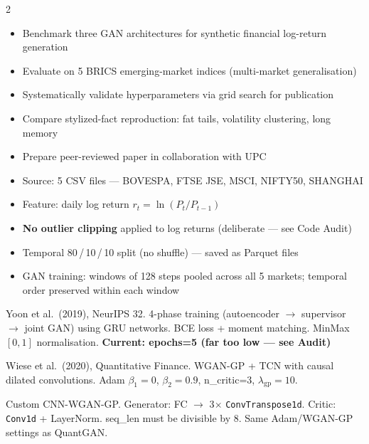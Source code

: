 \documentclass[10pt]{article}
\newcommand{\navybox}[2]{\begin{tcolorbox}[mybox={Navy}{LBg},title={#1}]#2\end{tcolorbox}}
\newcommand{\skybox}[2]{\begin{tcolorbox}[mybox={Sky}{BBg},title={#1}]#2\end{tcolorbox}}
\begin{document}
\begin{multicols}{2}

\navybox{Research Goal}{%
\begin{itemize}
  \item Benchmark three GAN architectures for synthetic financial log-return generation
  \item Evaluate on 5 BRICS emerging-market indices (multi-market generalisation)
  \item Systematically validate hyperparameters via grid search for publication
  \item Compare stylized-fact reproduction: fat tails, volatility clustering, long memory
  \item Prepare peer-reviewed paper in collaboration with UPC
\end{itemize}}

\skybox{Data Pipeline}{%
\begin{itemize}
  \item Source: 5 CSV files --- BOVESPA, FTSE JSE, MSCI, NIFTY50, SHANGHAI
  \item Feature: daily log return $r_t = \ln(P_t / P_{t-1})$
  \item \textbf{No outlier clipping} applied to log returns (deliberate --- see Code Audit)
  \item Temporal 80\,/\,10\,/\,10 split (no shuffle) --- saved as Parquet files
  \item GAN training: windows of 128 steps pooled across all 5 markets; temporal order preserved within each window
\end{itemize}}

\columnbreak

\begin{tcolorbox}[mybox={TGcol}{ABg},title={TimeGAN}]
Yoon et al.\ (2019), NeurIPS 32. 4-phase training (autoencoder $\to$ supervisor $\to$ joint GAN) using GRU networks. BCE loss + moment matching. MinMax $[0,1]$ normalisation.
\textcolor{DRed}{\bfseries\small Current: epochs=5 (far too low --- see Audit)}
\end{tcolorbox}

\begin{tcolorbox}[mybox={QGcol}{BBg},title={QuantGAN}]
Wiese et al.\ (2020), Quantitative Finance. WGAN-GP + TCN with causal dilated convolutions. Adam $\beta_1=0$, $\beta_2=0.9$, n\_critic=3, $\lambda_\text{gp}=10$.
\end{tcolorbox}

\begin{tcolorbox}[mybox={FGcol}{GBg},title={FinGAN}]
Custom CNN-WGAN-GP. Generator: FC $\to$ 3$\times$ \texttt{ConvTranspose1d}. Critic: \texttt{Conv1d} + LayerNorm. seq\_len must be divisible by 8. Same Adam/WGAN-GP settings as QuantGAN.
\end{tcolorbox}


\end{multicols}
\end{document}
